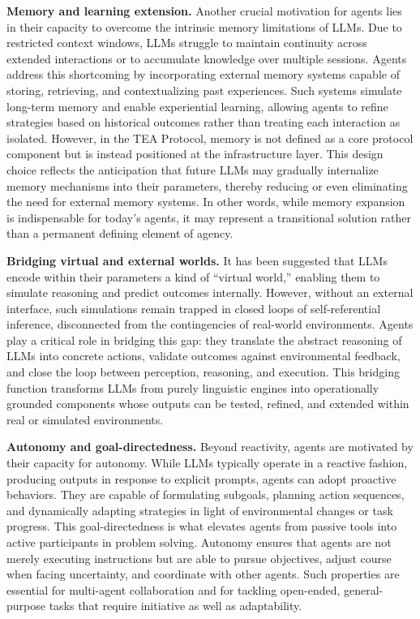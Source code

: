 \documentclass[11pt]{article}
\begin{document}
\textbf{Memory and learning extension.} Another crucial motivation for agents lies in their capacity to overcome the intrinsic memory limitations of LLMs. Due to restricted context windows, LLMs struggle to maintain continuity across extended interactions or to accumulate knowledge over multiple sessions. Agents address this shortcoming by incorporating external memory systems capable of storing, retrieving, and contextualizing past experiences. Such systems simulate long-term memory and enable experiential learning, allowing agents to refine strategies based on historical outcomes rather than treating each interaction as isolated. However, in the TEA Protocol, memory is not defined as a core protocol component but is instead positioned at the infrastructure layer. This design choice reflects the anticipation that future LLMs may gradually internalize memory mechanisms into their parameters, thereby reducing or even eliminating the need for external memory systems. In other words, while memory expansion is indispensable for today’s agents, it may represent a transitional solution rather than a permanent defining element of agency.  

\textbf{Bridging virtual and external worlds.} It has been suggested that LLMs encode within their parameters a kind of ``virtual world,'' enabling them to simulate reasoning and predict outcomes internally. However, without an external interface, such simulations remain trapped in closed loops of self-referential inference, disconnected from the contingencies of real-world environments. Agents play a critical role in bridging this gap: they translate the abstract reasoning of LLMs into concrete actions, validate outcomes against environmental feedback, and close the loop between perception, reasoning, and execution. This bridging function transforms LLMs from purely linguistic engines into operationally grounded components whose outputs can be tested, refined, and extended within real or simulated environments.  

\textbf{Autonomy and goal-directedness.} Beyond reactivity, agents are motivated by their capacity for autonomy. While LLMs typically operate in a reactive fashion, producing outputs in response to explicit prompts, agents can adopt proactive behaviors. They are capable of formulating subgoals, planning action sequences, and dynamically adapting strategies in light of environmental changes or task progress. This goal-directedness is what elevates agents from passive tools into active participants in problem solving. Autonomy ensures that agents are not merely executing instructions but are able to pursue objectives, adjust course when facing uncertainty, and coordinate with other agents. Such properties are essential for multi-agent collaboration and for tackling open-ended, general-purpose tasks that require initiative as well as adaptability.  
\end{document}
